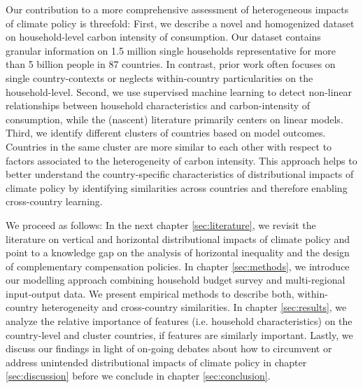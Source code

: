\documentclass[12pt, a4paper]{article}
\begin{document}
Our contribution to a more comprehensive assessment of heterogeneous impacts of climate policy is threefold: First, we describe a novel and homogenized dataset on household-level carbon intensity of consumption. Our dataset contains granular information on 1.5 million single households representative for more than 5 billion people in 87 countries. In contrast, prior work often focuses on single country-contexts or neglects within-country particularities on the household-level. Second, we use supervised machine learning to detect non-linear relationships between household characteristics and carbon-intensity of consumption, while the (nascent) literature primarily centers on linear models. Third, we identify different clusters of countries based on model outcomes. Countries in the same cluster are more similar to each other with respect to factors associated to the heterogeneity of carbon intensity. This approach helps to better understand the country-specific characteristics of distributional impacts of climate policy by identifying similarities across countries and therefore enabling cross-country learning. 


We proceed as follows: In the next chapter \ref{sec:literature}, we revisit the literature on vertical and horizontal distributional impacts of climate policy and point to a knowledge gap on the analysis of horizontal inequality and the design of complementary compensation policies. In chapter \ref{sec:methods}, we introduce our modelling approach combining household budget survey and multi-regional input-output data. We present empirical methods to describe both, within-country heterogeneity and cross-country similarities. In chapter \ref{sec:results}, we analyze the relative importance of features (i.e. household characteristics) on the country-level and cluster countries, if features are similarly important. Lastly, we discuss our findings in light of on-going debates about how to circumvent or address unintended distributional impacts of climate policy in chapter \ref{sec:discussion} before we conclude in chapter \ref{sec:conclusion}.  
\end{document}
